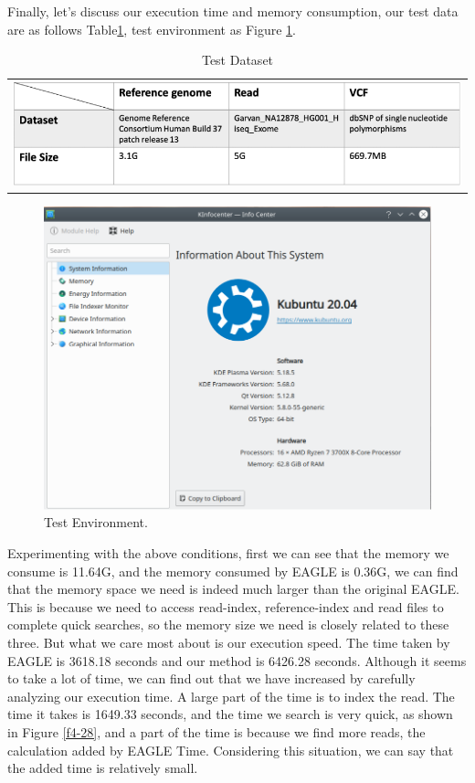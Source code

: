 Finally, let’s discuss our execution time and memory consumption, our test data are as follows Table\ref{t4-8}, test environment as Figure \ref{f4-27}.

\vspace{1cm}
\begin{table}[h]
    \centering
    \caption[Test Dataset]{Test Dataset}
    \vspace{-0.5cm}
    \begin{tabular}{c}
        \includegraphics[width=1\textwidth]{body/image/t4-8.png}
    \end{tabular}
    \label{t4-8}
\end{table}

\begin{figure}[H]
    \centering
    \includegraphics[width=0.8\columnwidth]{body/image/4-27.png}
    \captionsetup{labelfont=bf}
    \renewcommand{\baselinestretch}{1.0}
    \caption[Test Environment]{Test Environment.}
    \label{f4-27}
\end{figure}

Experimenting with the above conditions, first we can see that the memory we consume is 11.64G, and the memory consumed by EAGLE is 0.36G, we can find that the memory space we need is indeed much larger than the original EAGLE. This is because we need to access read-index, reference-index and read files to complete quick searches, so the memory size we need is closely related to these three.
But what we care most about is our execution speed. The time taken by EAGLE is 3618.18 seconds and our method is 6426.28 seconds. Although it seems to take a lot of time, we can find out that we have increased by carefully analyzing our execution time. A large part of the time is to index the read. The time it takes is 1649.33 seconds, and the time we search is very quick, as shown in Figure \ref{f4-28}, and a part of the time is because we find more reads, the calculation added by EAGLE Time. Considering this situation, we can say that the added time is relatively small.

